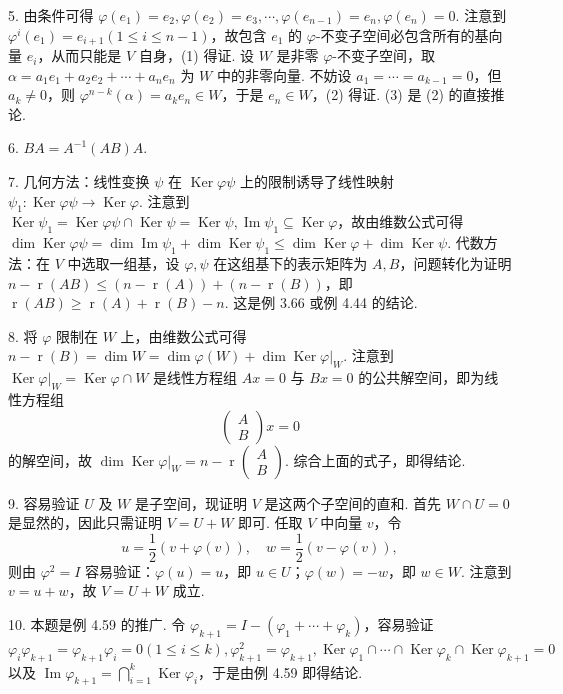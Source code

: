 \documentclass[UTF8,12pt,a4paper,fontset=fandol]{ctexart}
\begin{document}
5. 由条件可得 $\varphi(e_1)=e_2,\varphi(e_2)=e_3,\cdots,\varphi(e_{n-1})=e_n,\varphi(e_n)=0$. 注意到 $\varphi^i(e_1)=e_{i+1}(1\le i\le n-1)$，故包含 $e_1$ 的 $\varphi$-不变子空间必包含所有的基向量 $e_i$，从而只能是 $V$ 自身，(1) 得证. 设 $W$ 是非零 $\varphi$-不变子空间，取 $\alpha=a_1e_1+a_2e_2+\cdots+a_ne_n$ 为 $W$ 中的非零向量. 不妨设 $a_1=\cdots=a_{k-1}=0$，但 $a_k\ne0$，则 $\varphi^{n-k}(\alpha)=a_ke_n\in W$，于是 $e_n\in W$，(2) 得证. (3) 是 (2) 的直接推论.

6. $BA=A^{-1}(AB)A$.

7. 几何方法：线性变换 $\psi$ 在 $\operatorname{Ker}\varphi\psi$ 上的限制诱导了线性映射 $\psi_1:\operatorname{Ker}\varphi\psi\to\operatorname{Ker}\varphi$. 注意到 $\operatorname{Ker}\psi_1=\operatorname{Ker}\varphi\psi\cap\operatorname{Ker}\psi=\operatorname{Ker}\psi,\operatorname{Im}\psi_1\subseteq\operatorname{Ker}\varphi$，故由维数公式可得 $\dim\operatorname{Ker}\varphi\psi=\dim\operatorname{Im}\psi_1+\dim\operatorname{Ker}\psi_1\le\dim\operatorname{Ker}\varphi+\dim\operatorname{Ker}\psi$. 代数方法：在 $V$ 中选取一组基，设 $\varphi,\psi$ 在这组基下的表示矩阵为 $A,B$，问题转化为证明 $n-\operatorname{r}(AB)\le(n-\operatorname{r}(A))+(n-\operatorname{r}(B))$，即 $\operatorname{r}(AB)\ge\operatorname{r}(A)+\operatorname{r}(B)-n$. 这是例 3.66 或例 4.44 的结论.

8. 将 $\varphi$ 限制在 $W$ 上，由维数公式可得 $n-\operatorname{r}(B)=\dim W=\dim\varphi(W)+\dim\operatorname{Ker}\varphi|_W$. 注意到 $\operatorname{Ker}\varphi|_W=\operatorname{Ker}\varphi\cap W$ 是线性方程组 $Ax=0$ 与 $Bx=0$ 的公共解空间，即为线性方程组
\[
\left(\begin{array}{c}A\\B\end{array}\right)x=0
\]
的解空间，故 $\dim\operatorname{Ker}\varphi|_W=n-\operatorname{r}\left(\begin{array}{c}A\\B\end{array}\right)$. 综合上面的式子，即得结论.

9. 容易验证 $U$ 及 $W$ 是子空间，现证明 $V$ 是这两个子空间的直和. 首先 $W\cap U=0$ 是显然的，因此只需证明 $V=U+W$ 即可. 任取 $V$ 中向量 $v$，令
\[
u=\frac12(v+\varphi(v)),\quad w=\frac12(v-\varphi(v)),
\]
则由 $\varphi^2=I$ 容易验证：$\varphi(u)=u$，即 $u\in U$；$\varphi(w)=-w$，即 $w\in W$. 注意到 $v=u+w$，故
 $V=U+W$ 成立.

10. 本题是例 4.59 的推广. 令 $\varphi_{k+1}=I-(\varphi_1+\cdots+\varphi_k)$，容易验证 $\varphi_i\varphi_{k+1}=\varphi_{k+1}\varphi_i=0(1\le i\le k),\varphi_{k+1}^2=\varphi_{k+1},\operatorname{Ker}\varphi_1\cap\cdots\cap\operatorname{Ker}\varphi_k\cap\operatorname{Ker}\varphi_{k+1}=0$ 以及 $\operatorname{Im}\varphi_{k+1}=\bigcap_{i=1}^k\operatorname{Ker}\varphi_i$，于是由例 4.59 即得结论.
\end{document}
